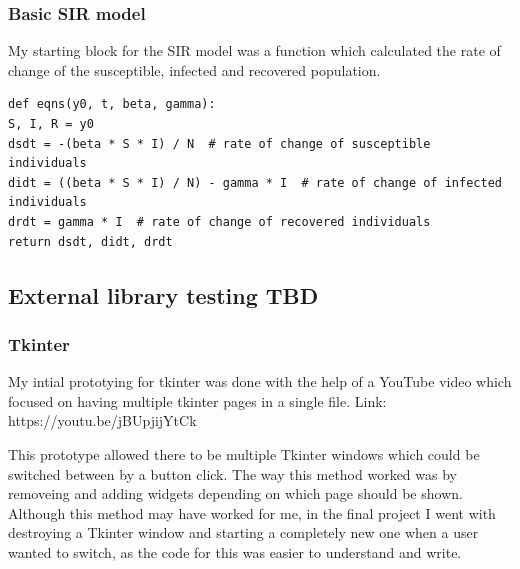 \documentclass[11pt, a4paper]{article}
\begin{document}
\subsubsection{Basic SIR model}
My starting block for the SIR model was a function which calculated the rate of change of the susceptible, infected and recovered population. 
\begin{lstlisting}
def eqns(y0, t, beta, gamma):
S, I, R = y0
dsdt = -(beta * S * I) / N  # rate of change of susceptible individuals
didt = ((beta * S * I) / N) - gamma * I  # rate of change of infected individuals
drdt = gamma * I  # rate of change of recovered individuals
return dsdt, didt, drdt
\end{lstlisting}

\subsection{External library testing TBD}
\subsubsection{Tkinter}
My intial prototying for tkinter was done with the help of a YouTube video which focused on having multiple tkinter pages in a single file.
Link: https://youtu.be/jBUpjijYtCk

This prototype allowed there to be multiple Tkinter windows which could be switched between by a button click. The way this method worked was by removeing and adding widgets depending on which page should be shown. Although this method may have worked for me, in the final project I went with destroying a Tkinter window and starting a completely new one when a user wanted to switch, as the code for this was easier to understand and write. 
\end{document}

